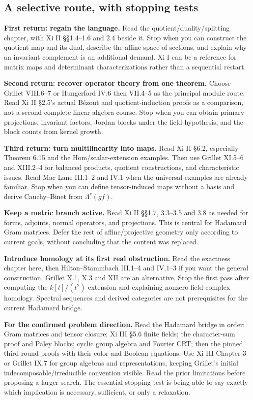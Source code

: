 \documentclass[
  11pt,
]{article}
\begin{document}
\subsection*{A selective route, with stopping
tests}\label{a-selective-route-with-stopping-tests}

\textbf{First return: regain the language.} Read the
quotient/duality/splitting chapter, with Xi II §§1.4--1.6 and 2.4 beside
it. Stop when you can construct the quotient map and its dual, describe
the affine space of sections, and explain why an invariant complement is
an additional demand. Xi I can be a reference for matrix maps and
determinant characterizations rather than a sequential restart.

\textbf{Second return: recover operator theory from one theorem.} Choose
Grillet VIII.6--7 or Hungerford IV.6 then VII.4--5 as the principal
module route. Read Xi II §2.5's actual Bézout and quotient-induction
proofs as a comparison, not a second complete linear algebra course.
Stop when you can obtain primary projections, invariant factors, Jordan
blocks under the field hypothesis, and the block counts from kernel
growth.

\textbf{Third return: turn multilinearity into maps.} Read Xi II §6.2,
especially Theorem 6.15 and the Hom/scalar-extension examples. Then use
Grillet XI.5--6 and XIII.2--4 for balanced products, quotient
constructions, and characteristic issues. Read Mac Lane III.1--2 and
IV.1 when the universal examples are already familiar. Stop when you can
define tensor-induced maps without a basis and derive Cauchy--Binet from
\(\Lambda^r(gf)\).

\textbf{Keep a metric branch active.} Read Xi II §§1.7, 3.3--3.5 and 3.8
as needed for forms, adjoints, normal operators, and projections. This
is central for Hadamard Gram matrices. Defer the rest of
affine/projective geometry only according to current goals, without
concluding that the content was replaced.

\textbf{Introduce homology at its first real obstruction.} Read the
exactness chapter here, then Hilton--Stammbach III.1--4 and IV.1--3 if
you want the general construction. Grillet X.1, X.3 and XII are an
alternative. Stop the first pass after computing the \(k[t]/(t^2)\)
extension and explaining nonzero field-complex homology. Spectral
sequences and derived categories are not prerequisites for the current
Hadamard bridge.

\textbf{For the confirmed problem direction.} Read the Hadamard bridge
in order: Gram matrices and tensor closure; Xi III §5.6 finite fields;
the character-sum proof and Paley blocks; cyclic group algebra and
Fourier CRT; then the pinned third-round proofs with their color and
Boolean equations. Use Xi III Chapter 3 or Grillet IX.7 for group
algebras and representations, keeping Grillet's initial
indecomposable/irreducible convention visible. Read the prior
limitations before proposing a larger search. The essential stopping
test is being able to say exactly which implication is necessary,
sufficient, or only a relaxation.
\end{document}
